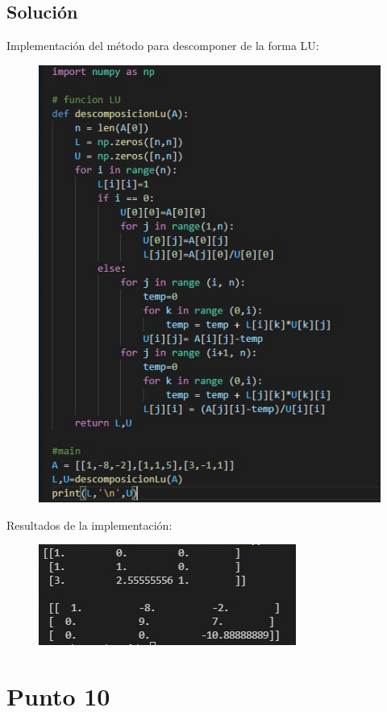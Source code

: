 \documentclass[10pt,letterpaper]{article}
\begin{document}
	\subsection{Solución}
	Implementación del método para descomponer de la forma LU:\\
	\begin{figure}[H]
		\includegraphics{imagen10}
		\centering
	\end{figure}
	Resultados de la implementación:\\
	\begin{figure}[H]
		\includegraphics{imagen11}
		\centering
	\end{figure}	
	
\section{Punto 10}
\end{document}
